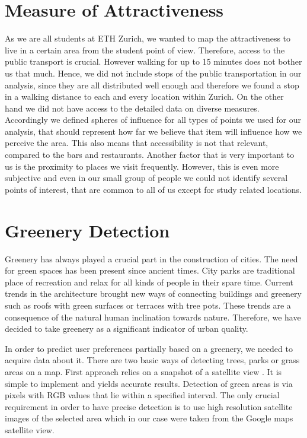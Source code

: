 \documentclass[letterpaper]{article}
\begin{document}
\section{Measure of Attractiveness}\label{sec:attractiveness}
As we are all students at ETH Zurich, we wanted to map the attractiveness to live in a certain area from the student point of view.
Therefore, access to the public transport is crucial. However walking for up to 15 minutes does not bother us that much. Hence, we did not
include stops of the public transportation in our analysis, since they are all distributed well enough and therefore we found a stop in a walking
distance to each and every location within Zurich.
On the other hand we did not have access to the detailed data on diverse measures. Accordingly we defined spheres of influence for all types
of points we used for our analysis, that should represent how far we believe that item will influence how we perceive the area.
This also means that accessibility is not that relevant, compared to the bars and restaurants. Another factor that is
very important to us is the proximity to places we visit frequently. However, this is even more subjective and even in our
small group of people we could not identify several points of interest, that are common to all of us except for study related locations.

\section{Greenery Detection}\label{sec:greenery}
\indent Greenery has always played a crucial part in the construction of cities. The need for green spaces has been present since ancient times.
City parks are traditional place of recreation and relax for all kinds of people in their spare time. Current trends in the architecture brought new ways of
connecting buildings and greenery such as roofs with green surfaces or terraces with tree pots. These trends are a consequence of the natural
human inclination towards nature. Therefore, we have decided to take greenery as a significant indicator of urban quality.

\indent In order to predict user preferences partially based on a greenery, we needed to acquire data about it. There are two basic ways of detecting trees,
parks or grass areas on a map. First approach relies on a snapshot of a satellite view \cite{smartCities}. It is simple to implement and yields accurate results.
Detection of green areas is via pixels with RGB values that lie within a specified interval. The only crucial requirement in order to have precise detection
is to use high resolution satellite images of the selected area which in our case were taken from the Google maps satellite view.
\end{document}
